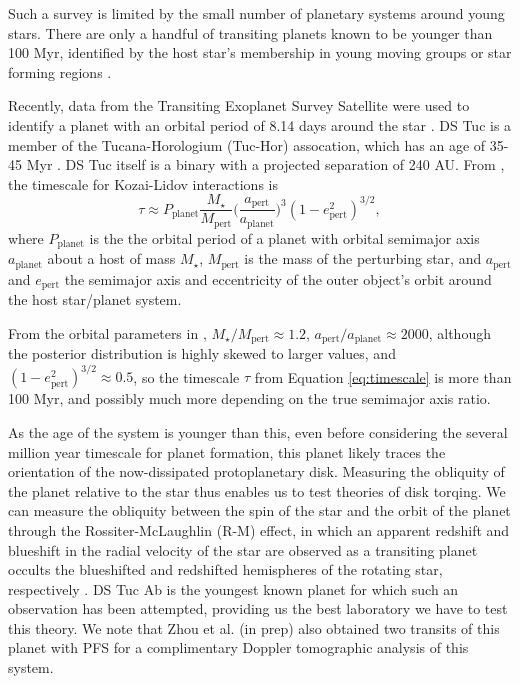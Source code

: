 \documentclass[twocolumn]{aastex63}
\begin{document}
Such a survey is limited by the small number of planetary systems around young stars. There are only a handful of transiting planets known to be younger than 100 Myr, identified by the host star's membership in young moving groups or star forming regions \citep{David16, Mann16, David19}.

Recently, data from the Transiting Exoplanet Survey Satellite \citep{Ricker14} were used to identify a planet with an orbital period of 8.14 days around the star  \citep{Benatti19, Newton19}. 
DS Tuc is a member of the Tucana-Horologium (Tuc-Hor) assocation, which has an age of 35-45 Myr \citep{Bell15, Crundall19}. 
DS Tuc itself is a binary with a projected separation of 240 AU. 
From \citet{Holman97}, the timescale for Kozai-Lidov interactions is
\begin{equation}
    \tau \approx P_\textrm{planet} \frac{M_\star}{M_\textrm{pert}} \bigg(\frac{a_\textrm{pert}}{a_\textrm{planet}}\bigg)^3 (1-e^2_\textrm{pert})^{3/2},
\label{eq:timescale}
\end{equation}
where $P_\textrm{planet}$ is the the orbital period of a planet with orbital semimajor axis  $a_\textrm{planet}$ about a host of mass $M_\star$, $M_\textrm{pert}$ is the
mass of the perturbing star, and $a_\textrm{pert}$ and $e_\textrm{pert}$ the semimajor axis and eccentricity of the outer object's orbit around the host star/planet system.

From the orbital parameters in \citet{Newton19}, ${M_\star}/{M_\textrm{pert}} \approx 1.2$, ${a_\textrm{pert}}/{a_\textrm{planet}} \approx 2000$, although the posterior distribution is highly skewed to larger values, and $(1-e^2_\textrm{pert})^{3/2} \approx 0.5$, so the timescale $\tau$ from Equation \ref{eq:timescale} is more than 100 Myr, and possibly much more depending on the true semimajor axis ratio. 


As the age of the system is younger than this, even before considering the several million year timescale for planet formation, this planet likely traces the orientation of the now-dissipated protoplanetary disk. 
Measuring the obliquity of the planet relative to the star thus enables us to test theories of disk torqing.
We can measure the obliquity between the spin of the star and the orbit of the planet through the Rossiter-McLaughlin (R-M) effect, in which an apparent redshift and blueshift in the radial velocity of the star are observed as a transiting planet occults the blueshifted and redshifted hemispheres of the rotating star, respectively \citep{Rossiter24, McLaughlin24}.
DS Tuc Ab is the youngest known planet for which such an observation has been attempted, providing us the best laboratory we have to test this theory.
We note that Zhou et al. (in prep) also obtained two transits of this planet with PFS for a complimentary Doppler tomographic analysis of this system.
\end{document}
